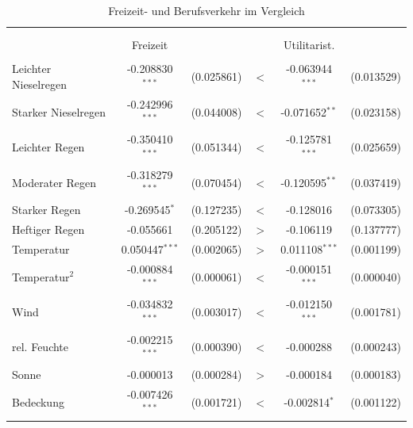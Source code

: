 \documentclass[a4paper,12pt]{thesis}
\begin{document}
\begin{table}[!htbp] \centering 
	\caption{Freizeit- und Berufsverkehr im Vergleich} 
	\label{utilitarianvsFreizeit} 
	\begin{tabular}{@{\extracolsep{-5pt}}lccccc} 
		\\[-1.8ex]\hline 
		\hline \\[-1.8ex] 
		\\[-1.8ex] & Freizeit & & & Utilitarist. & \\ 
		\hline \\[-1.8ex] 
		
		Leichter Nieselregen & -0.208830$^{***}$ & (0.025861) & $<$ & -0.063944$^{***}$ & (0.013529)\\ 
		
		Starker Nieselregen & -0.242996$^{***}$ & (0.044008) & $<$ & -0.071652$^{**}$ & (0.023158)\\ 
		
		Leichter Regen & -0.350410$^{***}$ & (0.051344) & $<$ & -0.125781$^{***}$ & (0.025659)\\ 
		
		Moderater Regen & -0.318279$^{***}$ & (0.070454) & $<$ & -0.120595$^{**}$ & (0.037419)\\ 
		
		Starker Regen & -0.269545$^{*}$ & (0.127235) & $<$ & -0.128016 & (0.073305)\\ 
		
		Heftiger Regen & -0.055661 & (0.205122) & $>$ & -0.106119 & (0.137777)\\ 
		
		Temperatur & 0.050447$^{***}$ & (0.002065) & $>$ & 0.011108$^{***}$ & (0.001199)\\ 
		
		Temperatur$^2$ & -0.000884$^{***}$ & (0.000061) & $<$ & -0.000151$^{***}$ & (0.000040)\\ 
		
		Wind & -0.034832$^{***}$ & (0.003017) & $<$ & -0.012150$^{***}$ & (0.001781)\\ 
		
		rel. Feuchte & -0.002215$^{***}$ & (0.000390) & $<$ & -0.000288 & (0.000243)\\ 
		
		Sonne & -0.000013 & (0.000284) & $>$ & -0.000184 & (0.000183)\\ 
		
		Bedeckung & -0.007426$^{***}$ & (0.001721) & $<$ & -0.002814$^{*}$ & (0.001122)\\ 
		

\end{tabular}
\end{table}
\end{document}
